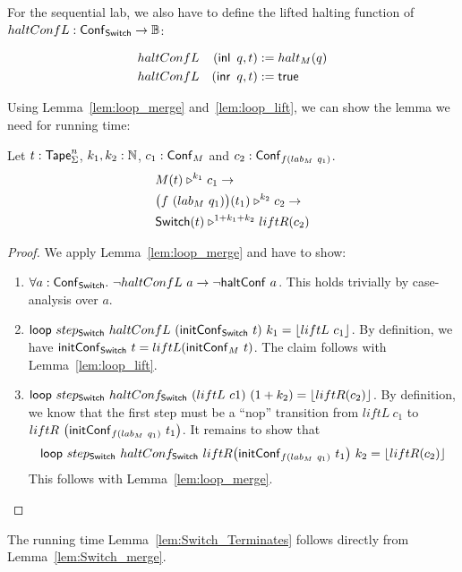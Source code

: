 For the sequential lab, we also have to define the lifted halting function of \\$haltConfL : \mathsf{Conf}_{\mathsf{Switch}} \rightarrow \mathbb{B}$:
\begin{definition}
  \begin{alignat*}{2}
    & haltConfL & (\operatorname{\mathsf{inl}}~q, t) &:= halt_M(q) \\
    & haltConfL & (\operatorname{\mathsf{inr}}~q, t) &:= \mathsf{true}
  \end{alignat*}
\end{definition}

Using Lemma~\ref{lem:loop_merge} and~\ref{lem:loop_lift}, we can show the lemma we need for running time:
\begin{lemma}
  \label{lem:Switch_merge}
  Let $t : \mathsf{Tape}_\Sigma^n$, $k_1, k_2:\mathbb{N}$, $c_1 : \mathsf{Conf}_M$ and $c_2 : \mathsf{Conf}_{f(lab_M~q_1)}$.
  \begin{alignat*}{1}
    & M(t) \mathrel{\triangleright}^{k_1} c_1 \rightarrow\\
    & \bigl( f~(lab_M~q_1) \bigr) (t_1) \mathrel{\triangleright}^{k_2} c_2 \rightarrow\\
    & \mathsf{Switch}(t) \mathrel{\triangleright}^{1+k_1+k_2} liftR(c_2)
  \end{alignat*}
\end{lemma}
\begin{proof}
  We apply Lemma~\ref{lem:loop_merge} and have to show:
  \begin{enumerate}
  \item $\forall a:\mathsf{Conf}_{\mathsf{Switch}}.~ \lnot haltConfL~a \rightarrow \lnot \mathsf{haltConf}~a$.  This holds trivially by case-analysis over $a$.
  \item $\mathsf{loop}~step_{\mathsf{Switch}}~haltConfL~(\mathsf{initConf}_{\mathsf{Switch}}~t)~k_1 =
    \left\lfloor {liftL~c_1} \right\rfloor$.  By definition, we have $\mathsf{initConf}_{\mathsf{Switch}}~t=liftL(\mathsf{initConf}_M~t)$.  The claim follows with Lemma~\ref{lem:loop_lift}.
  \item $\mathsf{loop}~step_{\mathsf{Switch}}~haltConf_{\mathsf{Switch}}~(liftL~c1)~(1+k_2) =
    \left\lfloor {liftR(c_2)} \right\rfloor$.  By definition, we know that the first step must be a ``nop'' transition from
    $liftL~c_1$ to\\
    $liftR~\bigl(\mathsf{initConf}_{f(lab_M~q_1)}~t_1 \bigr)$.  It remains to show that
    $$\mathsf{loop}~step_{\mathsf{Switch}}~haltConf_{\mathsf{Switch}}~liftR \bigl(\mathsf{initConf}_{f(lab_M~q_1)}~t_1 \bigr)~k_2 = \left\lfloor {liftR(c_2)} \right\rfloor$$
    This follows with Lemma~\ref{lem:loop_merge}.
  \end{enumerate}
\end{proof}
The running time Lemma~\ref{lem:Switch_Terminates} follows directly from Lemma~\ref{lem:Switch_merge}.

